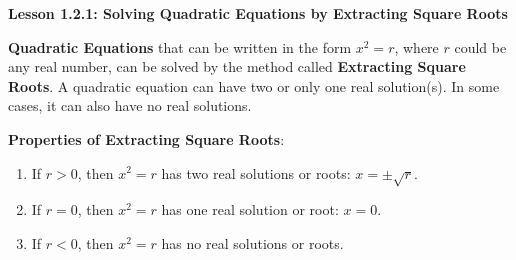 \begin{center}
\textbf{Lesson 1.2.1: Solving Quadratic Equations by Extracting Square Roots}
\end{center}

\vspace*{1ex}

\textbf{Quadratic Equations} that can be written in the form $x^2 = r$, where $r$ could be any real number, can be solved by the method called \textbf{Extracting Square Roots}. A quadratic equation can have two or only one real solution(s). In some cases, it can also have no real solutions.

\textbf{Properties of Extracting Square Roots}:

\begin{enumerate}[label = \color{blue}\arabic*. ]
   \item If $r > 0$, then $x^2 = r$ has two real solutions or roots: $x = \pm\sqrt{r} $. 
   \item If $r = 0$, then $x^2 = r$ has one real solution or root: $x = 0$.
   \item If $r < 0$, then $x^2 = r$ has no real solutions or roots.
 
\end{enumerate}
				
				
